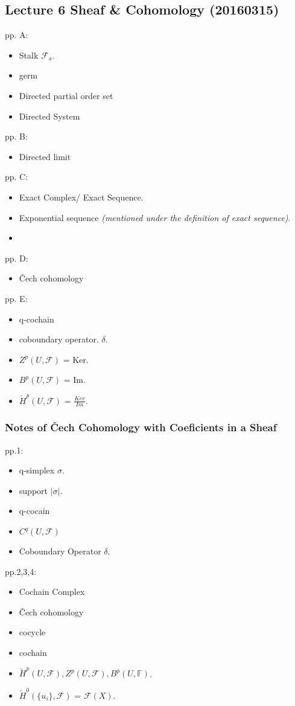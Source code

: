 \documentclass{article}
\numberwithin{equation}{subsection} %
\begin{document}
	\subsection{Lecture 6 Sheaf \& Cohomology (20160315)}
	pp. A:
		\begin{itemize}
			\item Stalk $\mathcal{F}_x$.
			\item germ
			\item Directed partial order set
			\item Directed System
		\end{itemize}
	pp. B:
		\begin{itemize}
			\item Directed limit
		\end{itemize}
	pp. C:
	\begin{itemize}
		\item Exact Complex/ Exact Sequence.
		\item Exponential sequence \textit{(mentioned under the definition of exact sequence)}.
		\item
	\end{itemize}
	pp. D:
	\begin{itemize}
		\item Čech cohomology
	\end{itemize}
	pp. E:
	\begin{itemize}
		\item q-cochain
		\item coboundary operator. $\delta$.
		\item $Z^p(U,\mathcal{F})$ = Ker.
		\item $B^p(U,\mathcal{F})$ = Im.
		\item $\check{H}^p(U,\mathcal{F})$ = $\frac{Ker}{Im}$.
	\end{itemize}
    \subsubsection{Notes of \v{C}ech Cohomology with Coeficients in a Sheaf}
		pp.1:
		\begin{itemize}
			\item q-simplex $\sigma$.
			\item support $|\sigma|$.
			\item q-cocain
			\item $C^q(U,\mathcal{F})$
			\item Coboundary Operator $\delta$.
		\end{itemize}
		pp.2,3,4:
		\begin{itemize}
			\item Cochain Complex
			\item Čech cohomology
			\item cocycle
			\item cochain
			\item $\check{H}^p(U,\mathcal{F}),Z^p(U,\mathcal{F}),B^p(U,\mathbb{F})$.
			\item $\check{H}^0(\{u_i\},\mathcal{F})$ = $\mathcal{F}(X)$.
		\end{itemize}
	
\end{document}
